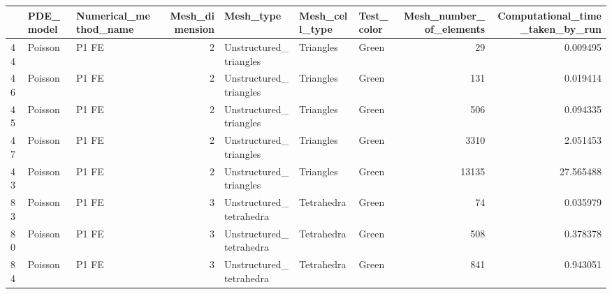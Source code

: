 \begin{tabular}{lllrlllrr}
\toprule
{} &         PDE\_model &          Numerical\_method\_name &  Mesh\_dimension &                       Mesh\_type &          Mesh\_cell\_type &                           Test\_color &  Mesh\_number\_of\_elements &  Computational\_time\_taken\_by\_run \\
\midrule
44  &           Poisson &                          P1 FE &               2 &          Unstructured\_triangles &              Triangles  &                                Green &                       29 &                         0.009495 \\
46  &           Poisson &                          P1 FE &               2 &          Unstructured\_triangles &              Triangles  &                                Green &                      131 &                         0.019414 \\
45  &           Poisson &                          P1 FE &               2 &          Unstructured\_triangles &              Triangles  &                                Green &                      506 &                         0.094335 \\
47  &           Poisson &                          P1 FE &               2 &          Unstructured\_triangles &              Triangles  &                                Green &                     3310 &                         2.051453 \\
43  &           Poisson &                          P1 FE &               2 &          Unstructured\_triangles &              Triangles  &                                Green &                    13135 &                        27.565488 \\
83  &           Poisson &                          P1 FE &               3 &         Unstructured\_tetrahedra &             Tetrahedra  &                                Green &                       74 &                         0.035979 \\
80  &           Poisson &                          P1 FE &               3 &         Unstructured\_tetrahedra &             Tetrahedra  &                                Green &                      508 &                         0.378378 \\
84  &           Poisson &                          P1 FE &               3 &         Unstructured\_tetrahedra &             Tetrahedra  &                                Green &                      841 &                         0.943051 \\

\end{tabular}
